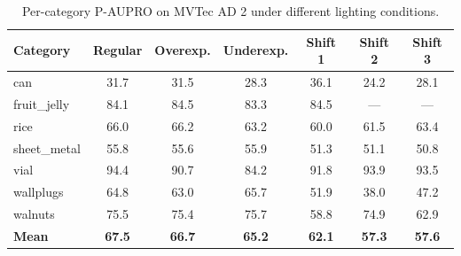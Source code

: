 \documentclass[10pt]{article} %
\begin{document}
\begin{table}[H]
\caption{Per-category P-AUPRO on MVTec AD 2 under different lighting conditions.}
\label{tab:lightshift_aupro}
\begin{center}
\small
\begin{tabular}{lcccccc}
\toprule
Category & Regular & Overexp. & Underexp. & Shift 1 & Shift 2 & Shift 3 \\
\midrule
can          & 31.7 & 31.5 & 28.3 & 36.1 & 24.2 & 28.1 \\
fruit\_jelly & 84.1 & 84.5 & 83.3 & 84.5 & --- & --- \\
rice         & 66.0 & 66.2 & 63.2 & 60.0 & 61.5 & 63.4 \\
sheet\_metal & 55.8 & 55.6 & 55.9 & 51.3 & 51.1 & 50.8 \\
vial         & 94.4 & 90.7 & 84.2 & 91.8 & 93.9 & 93.5 \\
wallplugs    & 64.8 & 63.0 & 65.7 & 51.9 & 38.0 & 47.2 \\
walnuts      & 75.5 & 75.4 & 75.7 & 58.8 & 74.9 & 62.9 \\
\midrule
\textbf{Mean} & \textbf{67.5} & \textbf{66.7} & \textbf{65.2} & \textbf{62.1} & \textbf{57.3} & \textbf{57.6} \\
\bottomrule
\end{tabular}
\end{center}
\end{table}
\end{document}
